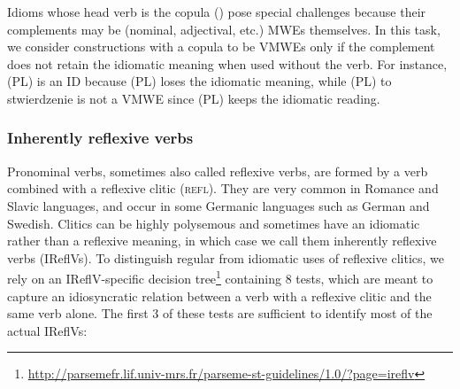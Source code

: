 \documentclass[output=paper,modfonts]{langscibook}
\begin{document}
Idioms whose head verb is the copula () pose special challenges because their complements may be (nominal, adjectival, etc.) MWEs themselves. In this task, we consider constructions with a copula to be VMWEs only if the complement does not retain the idiomatic meaning when used without the verb. For instance, (PL)  is an ID because (PL)  loses the idiomatic meaning, while (PL) to stwierdzenie  is not a VMWE since (PL)  keeps the idiomatic reading.

\subsubsection{Inherently reflexive verbs}
\label{sec:ireflvs}
%
Pronominal verbs, sometimes also called reflexive verbs, are formed by a verb combined with a reflexive clitic (\textsc{refl}). %
They are very common in Romance and Slavic languages, and occur in some Germanic languages such as German and Swedish. Clitics can be highly polysemous and sometimes have an idiomatic rather than a reflexive meaning, in which case we call them inherently reflexive verbs (IReflVs). To distinguish regular from idiomatic uses of reflexive clitics, we rely on an IReflV-specific decision tree\footnote{\url{http://parsemefr.lif.univ-mrs.fr/parseme-st-guidelines/1.0/?page=ireflv}} containing 8 tests, which are meant to capture an idiosyncratic relation between a verb with a reflexive clitic and the same verb alone. The first 3 of these tests are sufficient to identify most of the actual IReflVs:
\end{document}
